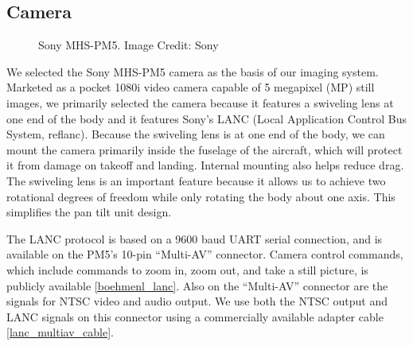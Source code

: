 \documentclass[10pt,twocolumns]{report}
\begin{document}
\subsection{Camera}
\begin{figure}
	\centering
	\caption{Sony MHS-PM5. Image Credit: Sony}
	\label{fig:camera}
\end{figure}

We selected the Sony MHS-PM5 camera as the basis of our imaging system. Marketed as a pocket 1080i video camera capable of 5 megapixel (MP) still images, we primarily selected the camera because it features a swiveling lens at one end of the body and it features Sony's LANC (Local Application Control Bus System, ref{lanc}). Because the swiveling lens is at one end of the body, we can mount the camera primarily inside the fuselage of the aircraft, which will protect it from damage on takeoff and landing. Internal mounting also helps reduce drag. The swiveling lens is an important feature because it allows us to achieve two rotational degrees of freedom while only rotating the body about one axis. This simplifies the pan tilt unit design.

The LANC protocol is based on a 9600 baud UART serial connection, and is available on the PM5's 10-pin ``Multi-AV'' connector. Camera control commands, which include commands to zoom in, zoom out, and take a still picture, is publicly available \ref{boehmenl_lanc}. Also on the ``Multi-AV'' connector are the signals for NTSC video and audio output. We use both the NTSC output and LANC signals on this connector using a commercially available adapter cable \ref{lanc_multiav_cable}.
\end{document}
